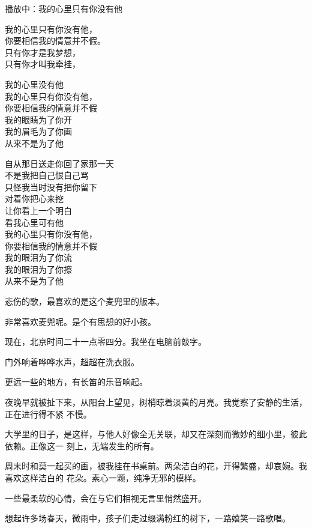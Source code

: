		播放中：我的心里只有你没有他

		\longpoem{}{}{}
			我的心里只有你没有他，\\
			你要相信我的情意并不假。\\
			只有你才是我梦想，\\
			只有你才叫我牵挂，

			我的心里没有他 \\
			我的心里只有你没有他，\\
			你要相信我的情意并不假 \\
			我的眼睛为了你开 \\
			我的眉毛为了你画 \\
			从来不是为了他

			自从那日送走你回了家那一天 \\
			不是我把自己恨自己骂 \\
			只怪我当时没有把你留下 \\
			对着你把心来挖 \\
			让你看上一个明白 \\
			看我心里可有他 \\
			我的心里只有你没有他，\\
			你要相信我的情意并不假 \\
			我的眼泪为了你流 \\
			我的眼泪为了你擦 \\
			从来不是为了他
		\endlongpoem


		悲伤的歌，最喜欢的是这个麦兜里的版本。

		非常喜欢麦兜呢。是个有思想的好小孩。

	\endwriting



		现在，北京时间二十一点零四分。我坐在电脑前敲字。\par
		门外响着哗哗水声，超超在洗衣服。\par
		更远一些的地方，有长笛的乐音响起。

		夜晚早就被扯下来，从阳台上望见，树梢晾着淡黄的月亮。我觉察了安静的生活，正在进行得不紧
	不慢。

		大学里的日子，是这样，与他人好像全无关联，却又在深刻而微妙的细小里，彼此依赖。正像这一
	刻上，无端发生的所有。


		周末时和莫一起买的画，被我挂在书桌前。两朵洁白的花，开得繁盛，却哀婉。我喜欢这样洁白的
	花朵。素心一颗，纯净无邪的模样。

		一些最柔软的心情，会在与它们相视无言里悄然盛开。

		想起许多场春天，微雨中，孩子们走过缀满粉红的树下，一路嬉笑一路歌唱。

